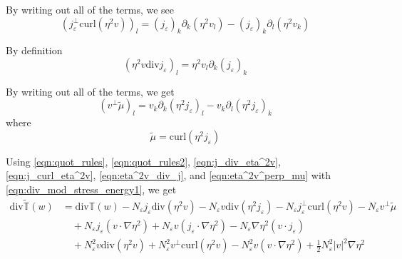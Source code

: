\documentclass[a4paper]{article}
\newcommand{\curl}{\mathrm{curl}}
\renewcommand{\div}{\mathrm{div}}
\begin{document}
By writing out all of the terms, we see
\begin{equation}
  (j_\varepsilon^\perp \curl ( \eta^2 v ) )_l = (j_\varepsilon)_k \partial_k ( \eta^2 v_l ) - (j_\varepsilon)_k \partial_l ( \eta^2 v_k )
  \label{eqn:j_curl_eta^2v}
\end{equation}

By definition
\begin{equation}
  ( \eta^2 v \div j_\varepsilon )_l = \eta^2 v_l \partial_k (j_\varepsilon)_k
  \label{eqn:eta^2v_div_j}
\end{equation}

By writing out all of the terms, we get
\begin{equation}
  ( v^\perp \tilde{\mu} )_l = v_k \partial_k (\eta^2 j_\varepsilon)_l - v_k \partial_l (\eta^2 j_\varepsilon)_k
  \label{eqn:eta^2v^perp_mu}
\end{equation}
where
\begin{equation}
  \tilde{\mu} = \curl ( \eta^2 j_\varepsilon )
  \label{eqn:mu}
\end{equation}

Using \eqref{eqn:quot_rules}, \eqref{eqn:quot_rules2}, \eqref{eqn:j_div_eta^2v}, \eqref{eqn:j_curl_eta^2v}, \eqref{eqn:eta^2v_div_j}, and \eqref{eqn:eta^2v^perp_mu} with
\eqref{eqn:div_mod_stress_energy1}, we get
\begin{align}
  \div \tilde{\mathbb{T}}(w) &= \div \mathbb{T}(w) - N_\varepsilon j_\varepsilon \div(\eta^2 v) - N_\varepsilon v \div (\eta^2 j_\varepsilon) -
  N_\varepsilon j_\varepsilon^\perp \curl( \eta^2 v ) - N_\varepsilon v^\perp \tilde{\mu} \nonumber \\
  &\quad + N_\varepsilon j_\varepsilon ( v \cdot \nabla \eta^2 ) + N_\varepsilon v (j_\varepsilon \cdot \nabla \eta^2 ) - N_\varepsilon \nabla \eta^2 (v \cdot j_\varepsilon) \nonumber \\
  &\quad + N_\varepsilon^2 v \div (\eta^2 v) + N_\varepsilon^2 v^\perp \curl ( \eta^2 v ) - N_\varepsilon^2 v (v \cdot \nabla \eta^2) + \frac{1}{2}
  N_\varepsilon^2 |v|^2 \nabla
  \eta^2
  \label{eqn:div_mod_stress_energy}
\end{align}
\end{document}
